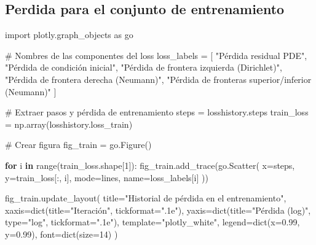 \documentclass[
  spanish,
  us-letterpaper,
]{scrreprt}
\newenvironment{Shaded}{\begin{snugshade}}{\end{snugshade}}
\newcommand{\BuiltInTok}[1]{\textcolor[rgb]{0.00,0.23,0.31}{#1}}
\newcommand{\CommentTok}[1]{\textcolor[rgb]{0.37,0.37,0.37}{#1}}
\newcommand{\ControlFlowTok}[1]{\textcolor[rgb]{0.00,0.23,0.31}{\textbf{#1}}}
\newcommand{\DecValTok}[1]{\textcolor[rgb]{0.68,0.00,0.00}{#1}}
\newcommand{\FloatTok}[1]{\textcolor[rgb]{0.68,0.00,0.00}{#1}}
\newcommand{\ImportTok}[1]{\textcolor[rgb]{0.00,0.46,0.62}{#1}}
\newcommand{\KeywordTok}[1]{\textcolor[rgb]{0.00,0.23,0.31}{\textbf{#1}}}
\newcommand{\NormalTok}[1]{\textcolor[rgb]{0.00,0.23,0.31}{#1}}
\newcommand{\OperatorTok}[1]{\textcolor[rgb]{0.37,0.37,0.37}{#1}}
\newcommand{\StringTok}[1]{\textcolor[rgb]{0.13,0.47,0.30}{#1}}
\theoremstyle{plain}
\theoremstyle{definition}
\theoremstyle{remark}
\begin{document}
\subsection{Perdida para el conjunto de
entrenamiento}\label{perdida-para-el-conjunto-de-entrenamiento}

\begin{Shaded}
\begin{Highlighting}[]
\ImportTok{import}\NormalTok{ plotly.graph\_objects }\ImportTok{as}\NormalTok{ go}

\CommentTok{\# Nombres de las componentes del loss}
\NormalTok{loss\_labels }\OperatorTok{=}\NormalTok{ [}
    \StringTok{"Pérdida residual PDE"}\NormalTok{,}
    \StringTok{"Pérdida de condición inicial"}\NormalTok{,}
    \StringTok{"Pérdida de frontera izquierda (Dirichlet)"}\NormalTok{,}
    \StringTok{"Pérdida de frontera derecha (Neumann)"}\NormalTok{,}
    \StringTok{"Pérdida de fronteras superior/inferior (Neumann)"}
\NormalTok{]}

\CommentTok{\# Extraer pasos y pérdida de entrenamiento}
\NormalTok{steps }\OperatorTok{=}\NormalTok{ losshistory.steps}
\NormalTok{train\_loss }\OperatorTok{=}\NormalTok{ np.array(losshistory.loss\_train)}

\CommentTok{\# Crear figura}
\NormalTok{fig\_train }\OperatorTok{=}\NormalTok{ go.Figure()}

\ControlFlowTok{for}\NormalTok{ i }\KeywordTok{in} \BuiltInTok{range}\NormalTok{(train\_loss.shape[}\DecValTok{1}\NormalTok{]):}
\NormalTok{    fig\_train.add\_trace(go.Scatter(}
\NormalTok{        x}\OperatorTok{=}\NormalTok{steps,}
\NormalTok{        y}\OperatorTok{=}\NormalTok{train\_loss[:, i],}
\NormalTok{        mode}\OperatorTok{=}\StringTok{\textquotesingle{}lines\textquotesingle{}}\NormalTok{,}
\NormalTok{        name}\OperatorTok{=}\NormalTok{loss\_labels[i]}
\NormalTok{    ))}

\NormalTok{fig\_train.update\_layout(}
\NormalTok{    title}\OperatorTok{=}\StringTok{"Historial de pérdida en el entrenamiento"}\NormalTok{,}
\NormalTok{    xaxis}\OperatorTok{=}\BuiltInTok{dict}\NormalTok{(title}\OperatorTok{=}\StringTok{"Iteración"}\NormalTok{, tickformat}\OperatorTok{=}\StringTok{".1e"}\NormalTok{),}
\NormalTok{    yaxis}\OperatorTok{=}\BuiltInTok{dict}\NormalTok{(title}\OperatorTok{=}\StringTok{"Pérdida (log)"}\NormalTok{, }\BuiltInTok{type}\OperatorTok{=}\StringTok{"log"}\NormalTok{, tickformat}\OperatorTok{=}\StringTok{".1e"}\NormalTok{),}
\NormalTok{    template}\OperatorTok{=}\StringTok{"plotly\_white"}\NormalTok{,}
\NormalTok{    legend}\OperatorTok{=}\BuiltInTok{dict}\NormalTok{(x}\OperatorTok{=}\FloatTok{0.99}\NormalTok{, y}\OperatorTok{=}\FloatTok{0.99}\NormalTok{),}
\NormalTok{    font}\OperatorTok{=}\BuiltInTok{dict}\NormalTok{(size}\OperatorTok{=}\DecValTok{14}\NormalTok{)}
\NormalTok{)}
\end{Highlighting}
\end{Shaded}
\end{document}
